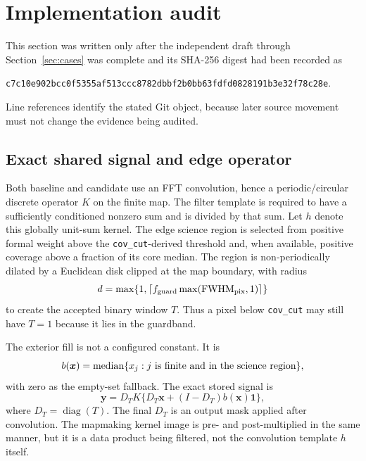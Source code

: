 \documentclass[11pt]{article}
\newcommand{\diag}{\operatorname{diag}}
\newcommand{\code}[1]{\nolinkurl{#1}}
\begin{document}
\section{Implementation audit}
\label{sec:implementation}

This section was written only after the independent draft through
Section~\ref{sec:cases} was complete and its SHA-256 digest had been recorded
as
\begin{center}
\small\code{c7c10e902bcc0f5355af513ccc8782dbbf2b0bb63fdfd0828191b3e32f78c28e}.
\end{center}
Line references identify the stated Git object, because later source movement
must not change the evidence being audited.

\subsection{Exact shared signal and edge operator}

Both baseline and candidate use an FFT convolution, hence a periodic/circular
discrete operator $K$ on the finite map.  The filter template is required to
have a sufficiently conditioned nonzero sum and is divided by that sum.  Let
$h$ denote this globally unit-sum kernel.  The edge science region is selected
from positive formal weight above the \code{cov_cut}-derived threshold and,
when available, positive coverage above a fraction of its core median.  The
region is non-periodically dilated by a Euclidean disk clipped at the map
boundary, with radius
\begin{equation}
 d=\max\{1,\lceil f_{\rm guard}\max({\rm FWHM}_{\rm pix},1)\rceil\}
 \label{eq:implemented-guard-radius}
\end{equation}
to create the accepted binary window $T$.  Thus a pixel below \code{cov_cut}
may still have $T=1$ because it lies in the guardband.

The exterior fill is not a configured constant.  It is
\begin{equation}
 b(\boldsymbol x)=\operatorname{median}\{x_j:j\hbox{ is finite and in the
 science region}\},
 \label{eq:implemented-background}
\end{equation}
with zero as the empty-set fallback.  The exact stored signal is
\begin{equation}
 \boldsymbol y=D_TK\{D_T\boldsymbol x+(I-D_T)b(\boldsymbol x)\boldsymbol1\},
 \label{eq:implemented-signal}
\end{equation}
where $D_T=\diag(T)$.  The final $D_T$ is an output mask applied after
convolution.  The mapmaking kernel image is pre- and post-multiplied in the
same manner, but it is a data product being filtered, not the convolution
template $h$ itself.
\end{document}

